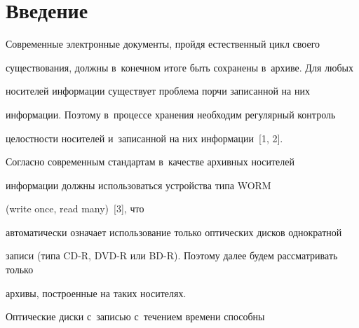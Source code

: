 









 \thispagestyle{headings}


 


 \vspace*{-20pt}


  


  


\section{Введение}





 \vspace*{-4pt}


 


  Современные электронные документы, пройдя естественный цикл своего 


существования, должны в~конечном итоге быть сохранены в~архиве. Для любых 


носителей информации существует проблема порчи записанной на них 


информации. Поэтому в~процессе хранения необходим регулярный контроль 


целостности носителей и~записанной на них информации~[1, 2].


  


  Согласно современным стандартам в~качестве архивных носителей 


информации должны использоваться устройства типа WORM


(write once, read many)~[3], что 


автоматически означает использование только оптических дисков однократной 


записи (типа CD-R, DVD-R или BD-R). Поэтому далее будем рассматривать только 


архивы, построенные на таких носителях.


  


  Оптические диски с~записью с~течением времени способны 


